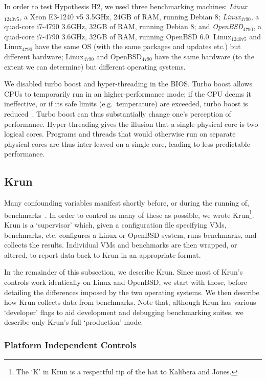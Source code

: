 \documentclass[acmsmall,screen]{acmart}
\newcommand{\kalibera}{Kalibera and Jones\xspace}
\newcommand{\krun}{Krun\xspace}
\newcommand{\hyptwo}{H2\xspace}
\newcommand{\bencherfive}{Linux$_\mathrm{4790}$\xspace}
\newcommand{\benchersix}{OpenBSD$_\mathrm{4790}$\xspace}
\newcommand{\bencherseven}{Linux$_\mathrm{1240v5}$\xspace}
\begin{document}
In order to test Hypothesis \hyptwo, we used three benchmarking machines: \emph{\bencherseven}, a Xeon E3-1240 v5 3.5GHz,
24GB of RAM, running Debian 8; \emph{\bencherfive}, a quad-core i7-4790
3.6GHz, 32GB of RAM, running Debian 8; and \emph{\benchersix}, a quad-core i7-4790
3.6GHz, 32GB of RAM, running OpenBSD 6.0. \bencherseven and \bencherfive
have the same OS (with the same packages and updates etc.) but different hardware; \bencherfive
and \benchersix have the same hardware (to the extent we can determine)
but different operating systems.

We disabled turbo boost and hyper-threading in the BIOS. Turbo boost
allows CPUs to temporarily run in an higher-performance
mode; if the CPU deems it ineffective, or if its safe limits (e.g.~temperature) are exceeded,
turbo boost is reduced~\cite{charles09turboboost}. Turbo boost
can thus substantially change one's
perception of performance. Hyper-threading gives the illusion that a single
physical core is two logical cores. Programs and threads that would
otherwise run on separate physical cores are thus inter-leaved on
a single core, leading to less predictable performance.


\subsection{\krun}
\label{krun}

Many confounding variables manifest shortly before, or during the running of,
benchmarks~\cite{kalibera05precision}. In order to control as many of these as possible, we wrote
\krun\footnote{The `K' in Krun is a respectful tip of the hat to \kalibera.}.
\krun is a `supervisor'
which, given a configuration file specifying VMs, benchmarks, etc. configures
a Linux or OpenBSD system, runs benchmarks, and collects the results. Individual VMs and benchmarks
are then wrapped, or altered, to report data back to \krun in an appropriate format.

In the remainder of this subsection, we describe \krun. Since most of \krun's
controls work identically on Linux and OpenBSD, we start with those,
before detailing the differences imposed by the two operating systems. We then
describe how \krun collects data from benchmarks.
Note that, although \krun has various `developer' flags to aid development
and debugging benchmarking suites, we describe only \krun's full `production' mode.


\subsubsection{Platform Independent Controls}
\end{document}
